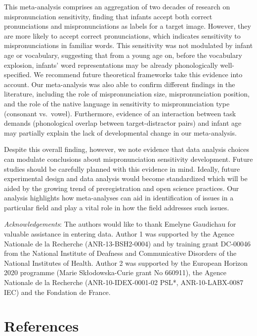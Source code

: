 \documentclass[man]{apa6}
\begin{document}
This meta-analysis comprises an aggregation of two decades of research on mispronunciation sensitivity, finding that infants accept both correct pronunciations and mispronunciations as labels for a target image. However, they are more likely to accept correct pronunciations, which indicates sensitivity to mispronunciations in familiar words. This sensitivity was not modulated by infant age or vocabulary, suggesting that from a young age on, before the vocabulary explosion, infants' word representations may be already phonologically well-specified. We recommend future theoretical frameworks take this evidence into account. Our meta-analysis was also able to confirm different findings in the literature, including the role of mispronunciation size, mispronunciation position, and the role of the native language in sensitivity to mispronunciation type (consonant vs.~vowel). Furthermore, evidence of an interaction between task demands (phonological overlap between target-distractor pairs) and infant age may partially explain the lack of developmental change in our meta-analysis.

Despite this overall finding, however, we note evidence that data analysis choices can modulate conclusions about mispronunciation sensitivity development. Future studies should be carefully planned with this evidence in mind. Ideally, future experimental design and data analysis would become standardized which will be aided by the growing trend of preregistration and open science practices. Our analysis highlights how meta-analyses can aid in identification of issues in a particular field and play a vital role in how the field addresses such issues.

\newpage

\emph{Acknowledgements}: The authors would like to thank Emelyne Gaudichau for valuable assistance in entering data. Author 1 was supported by the Agence Nationale de la Recherche (ANR-13-BSH2-0004) and by training grant DC-00046 from the National Institute of Deafness and Communicative Disorders of the National Institutes of Health. Author 2 was supported by the European Horizon 2020 programme (Marie Skłodowska-Curie grant No 660911), the Agence Nationale de la Recherche (ANR-10-IDEX-0001-02 PSL*, ANR-10-LABX-0087 IEC) and the Fondation de France.

\newpage

\hypertarget{references}{%
\section{References}\label{references}}
\end{document}
